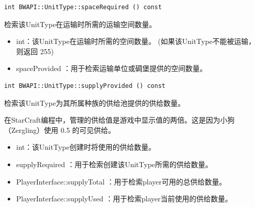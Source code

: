 \begin{tcolorbox}[colback=white, colframe=black!60!white, title=spaceRequired(), arc=0mm]
    \begin{verbatim}
int BWAPI::UnitType::spaceRequired () const
    \end{verbatim}
    检索该UnitType在运输时所需的运输空间数量。
    \begin{return}
        \begin{itemize}
            \item int：该UnitType在运输时所需的空间数量。
            (如果该UnitType不能被运输，则返回 255)
        \end{itemize}
    \end{return}
    \begin{refer}
        \begin{itemize}
            \item  spaceProvided  ：用于检索运输单位或碉堡提供的空间数量。
        \end{itemize}
    \end{refer}
\end{tcolorbox}


\begin{tcolorbox}[colback=white, colframe=black!60!white, title=supplyProvided(), arc=0mm]
    \begin{verbatim}
int BWAPI::UnitType::supplyProvided () const
    \end{verbatim}
    检索该UnitType为其所属种族的供给池提供的供给数量。
    \begin{note}
        在StarCraft编程中，管理的供给值是游戏中显示值的两倍。这是因为小狗（Zergling）使用 0.5 的可见供给。
    \end{note}
    \begin{return}
        \begin{itemize}
            \item int：该UnitType创建时将使用的供给数量。
        \end{itemize}
    \end{return}
    \begin{refer}
        \begin{itemize}
            \item supplyRequired  ：用于检索创建该UnitType所需的供给数量。
            \item PlayerInterface::supplyTotal  ：用于检索player可用的总供给数量。
            \item PlayerInterface::supplyUsed  ：用于检索player当前使用的供给数量。
        \end{itemize}
    \end{refer}
\end{tcolorbox}


